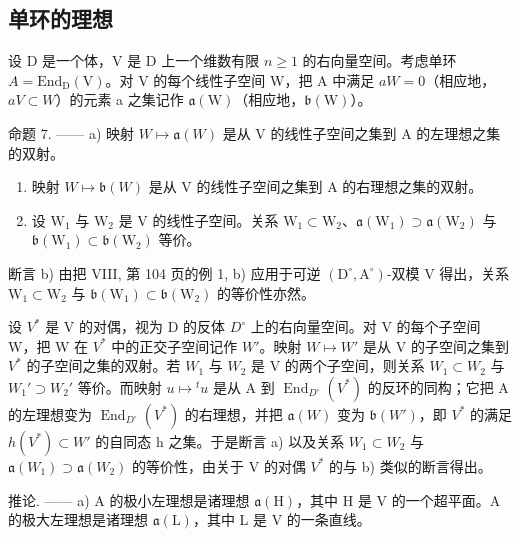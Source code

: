 \subsection{单环的理想}

设 D 是一个体，V 是 D 上一个维数有限 \(n \geqslant 1\) 的右向量空间。考虑单环 \(A = \text{End}_{\text{D}}(\text{V})\)。对 V 的每个线性子空间 W，把 A 中满足 \(aW = 0\)（相应地，\(aV \subset W\)）的元素 a 之集记作 \(\mathfrak{a}(\text{W})\)（相应地，\(\mathfrak{b}(\text{W})\)）。

命题 7. —— a) 映射 \(W \mapsto \mathfrak{a}(W)\) 是从 V 的线性子空间之集到 A 的左理想之集的双射。

\begin{enumerate}
\def\labelenumi{\alph{enumi})}
\setcounter{enumi}{1}
\item
  映射 \(W \mapsto \mathfrak{b}(W)\) 是从 V 的线性子空间之集到 A 的右理想之集的双射。
\item
  设 \(\mathrm{W}_1\) 与 \(\mathrm{W}_2\) 是 \(\mathrm{V}\) 的线性子空间。关系 \(\mathrm{W}_1 \subset \mathrm{W}_2\)、\(\mathfrak{a}(\mathrm{W}_1) \supset \mathfrak{a}(\mathrm{W}_2)\) 与 \(\mathfrak{b}(\mathrm{W}_1) \subset \mathfrak{b}(\mathrm{W}_2)\) 等价。
\end{enumerate}

断言 b) 由把 VIII, 第 104 页的例 1, b) 应用于可逆 \((\mathrm{D}^{\circ},\mathrm{A}^{\circ})\)-双模 V 得出，关系 \(\mathrm{W}_1\subset \mathrm{W}_2\) 与 \(\mathfrak{b}(\mathrm{W}_1)\subset \mathfrak{b}(\mathrm{W}_2)\) 的等价性亦然。

设 \(V^{*}\) 是 V 的对偶，视为 D 的反体 \(D^{\circ}\) 上的右向量空间。对 V 的每个子空间 W，把 W 在 \(V^{*}\) 中的正交子空间记作 \(W'\)。映射 \(W \mapsto W'\) 是从 V 的子空间之集到 \(V^{*}\) 的子空间之集的双射。若 \(W_{1}\) 与 \(W_{2}\) 是 V 的两个子空间，则关系 \(W_{1} \subset W_{2}\) 与 \(W_{1}' \supset W_{2}'\) 等价。而映射 \(u \mapsto {}^{t}u\) 是从 A 到 \(\operatorname{End}_{D^{\circ}}(V^{*})\) 的反环的同构；它把 A 的左理想变为 \(\operatorname{End}_{D^{\circ}}(V^{*})\) 的右理想，并把 \(\mathfrak{a}(W)\) 变为 \(\mathfrak{b}(W')\)，即 \(V^{*}\) 的满足 \(h(V^{*}) \subset W'\) 的自同态 h 之集。于是断言 a) 以及关系 \(W_{1} \subset W_{2}\) 与 \(\mathfrak{a}(W_{1}) \supset \mathfrak{a}(W_{2})\) 的等价性，由关于 V 的对偶 \(V^{*}\) 的与 b) 类似的断言得出。

推论. —— a) A 的极小左理想是诸理想 \(\mathfrak{a}(\mathrm{H})\)，其中 H 是 V 的一个超平面。A 的极大左理想是诸理想 \(\mathfrak{a}(\mathrm{L})\)，其中 L 是 V 的一条直线。

